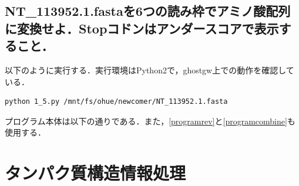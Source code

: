 \documentclass[uplatex,a4j]{jsarticle}
\begin{document}
  \subsection{NT\_113952.1.fastaを6つの読み枠でアミノ酸配列に変換せよ．Stopコドンはアンダースコアで表示すること．}
  以下のように実行する．実行環境はPython2で，ghostgw上での動作を確認している．
  \begin{lstlisting}[caption=実行方法, label=run5]
    python 1_5.py /mnt/fs/ohue/newcomer/NT_113952.1.fasta
  \end{lstlisting}
  プログラム本体は以下の通りである．また，\ref{programrev}と\ref{programcombine}も使用する．
  
  
  
  \section{タンパク質構造情報処理}
\end{document}
